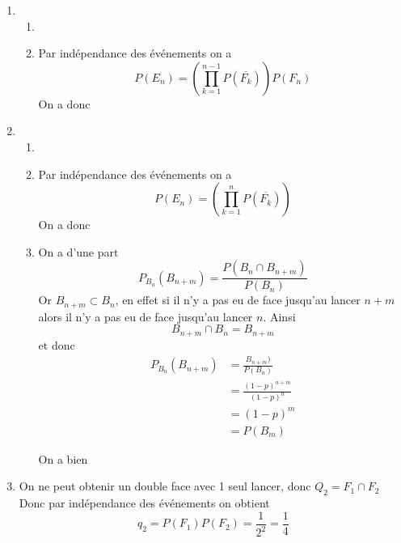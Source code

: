 \documentclass[a4paper, 11pt,reqno]{article}
\begin{document}
\begin{exercice}
\begin{enumerate}
\end{enumerate}





\end{exercice}

\begin{correction}
\begin{enumerate}
\item \begin{enumerate}
\item {}
\item Par indépendance des événements on a 
$$P(E_n) = \left(\prod_{k=1}^{n-1}P( \overline{F_k} )\right) P(F_n)$$
On a donc 

\end{enumerate}
\item \begin{enumerate}
\item {}
\item Par indépendance des événements on a 
$$P(E_n) = \left(\prod_{k=1}^{n}P( \overline{F_k} )\right)$$
On a donc 
\item On  a d'une part 
$$P_{B_n} (B_{n+m}) = \frac{P(B_n \cap B_{n+m})}{P(B_n)}$$
Or $B_{n+m} \subset B_n$, en effet si il n'y a pas eu de face jusqu'au lancer $n+m $ alors il n'y a pas eu de face jusqu'au lancer $n$. Ainsi 
$$B_{n+m} \cap B_n = B_{n+m}$$ et donc 
\begin{align*}
P_{B_n} (B_{n+m})&= \frac{B_{n+m})}{P(B_n)}\\
							&= \frac{(1-p)^{n+m}}{(1-p)^n}\\
							&= (1-p)^m\\
							&=P(B_m)
\end{align*}

On a bien
\end{enumerate}
\item
\begin{enumerate}



 On ne peut obtenir un double face avec 1 seul lancer, donc 
$Q_2=F_1\cap F_2$ Donc par indépendance des événements on obtient 
$$q_2= P(F_1)P(F_2) = \frac{1}{2^2}= \frac{1}{4}$$


\end{enumerate}
\end{enumerate}
\end{correction}
\end{document}
